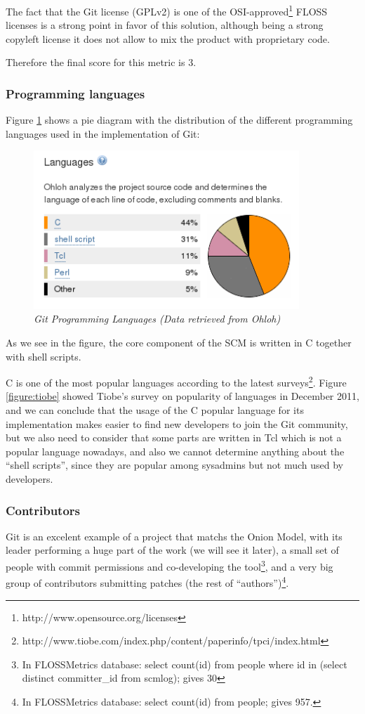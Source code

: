\documentclass[a4paper,10pt]{article}
\begin{document}
The fact that the Git license (GPLv2) is one of the
OSI-approved\footnote{http://www.opensource.org/licenses} FLOSS licenses is
a strong point in favor of this solution, although being a strong copyleft
license it does not allow to mix the product with proprietary code.

Therefore the final score for this metric is 3.

\subsubsection{Programming languages}

Figure \ref{figure:gitlanguages} shows a pie diagram with the distribution of
the different programming languages used in the implementation of Git:

\begin{figure}[H]
    \centering
    \includegraphics[width=10cm, keepaspectratio]{img/Gitlanguages.png}
    \caption{\textit{Git Programming Languages (Data retrieved from
Ohloh)}}
    \label{figure:gitlanguages}
 \end{figure}

As we see in the figure, the core component of the SCM is written in
C together with shell scripts.

C is one of the most popular languages according to the latest
surveys\footnote{
http://www.tiobe.com/index.php/content/paperinfo/tpci/index.html}. Figure
\ref{figure:tiobe}
showed Tiobe's survey on popularity of languages in December 2011, and we can
conclude that the usage of the C popular language for its implementation makes
easier to find new developers to join the Git community, but we also need to
consider that some parts are written in Tcl which is not a popular language
nowadays, and also we cannot determine anything about the ``shell scripts'',
since they are popular among sysadmins but not much used by developers.

\subsubsection{Contributors}
Git is an excelent example of a project that matchs the Onion
Model\cite{Onion}, with its leader performing a huge part of the work (we will
see it later), a small set of people with commit permissions and co-developing
the tool\footnote{In FLOSSMetrics database: select count(id) from people
where id in (select distinct committer\_id from scmlog); gives 30}, and a very
big group of contributors submitting patches (the rest of
``authors'')\footnote{In FLOSSMetrics database: select count(id) from
people; gives 957.}.
\end{document}
